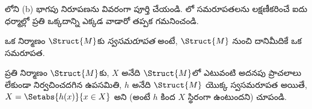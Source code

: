 \documentclass[../../../include/open-logic-section]{subfiles}
\begin{document}
\begin{prob}
లోని (b) భాగపు నిరూపణను వివరంగా
పూర్తి చేయండి. లో సమరూపతలను
లక్షణీకరించే ఐదు ధర్మాల్లో ప్రతి ఒక్కదాన్ని ఎక్కడ వాడారో తప్పక
గమనించండి.
\end{prob}

\begin{defn}
ఒక నిర్మాణం $\Struct{M}$కు \emph{స్వసమరూపత} అంటే,
$\Struct{M}$ నుంచి దానిమీదికే ఒక సమరూపత.
\end{defn}

\begin{prob}
ప్రతి నిర్మాణం $\Struct{M}$కు, $X$ అనేది $\Struct{M}$లో ఎటువంటి
అదనపు ప్రాచలాలు లేకుండా నిర్వచించదగిన ఉపసమితి, $h$ అనేది
$\Struct{M}$ యొక్క స్వసమరూపత
అయితే, $X=\Setabs{h(x)}{x \in X}$ అని (అంటే $h$ కింద $X$ స్థిరంగా
ఉంటుందని) చూపండి.
\end{prob}
\end{document}
